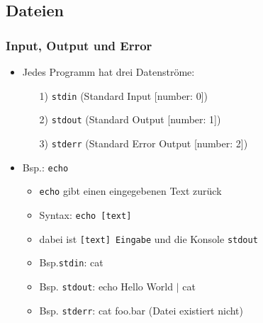 \documentclass[12pt,utf8]{beamer}
\begin{document}

\subsection{Dateien}
\begin{frame}
\frametitle{Input, Output und Error}
\begin{itemize}
	\item Jedes Programm hat drei Datenströme:
	\begin{itemize}
		\item[1)] \texttt{stdin} (Standard Input [number: 0])
		\item[2)] \texttt{stdout} (Standard Output [number: 1])
		\item[3)] \texttt{stderr} (Standard Error Output [number: 2])
	\end{itemize}
	\item Bsp.: \texttt{echo}
	\begin{itemize}[<+->]
		\item \texttt{echo} gibt einen eingegebenen Text zurück
		\item Syntax: \texttt{echo [text]}
		\item dabei ist \texttt{[text] Eingabe} und die Konsole \texttt{stdout}
		\item Bsp.\texttt{stdin}: cat
		\item Bsp. \texttt{stdout}: echo Hello World \texttt{$\mid$} cat
		\item Bsp. \texttt{stderr}: cat foo.bar (Datei existiert nicht)
	\end{itemize}
\end{itemize}
\end{frame}
\end{document}
